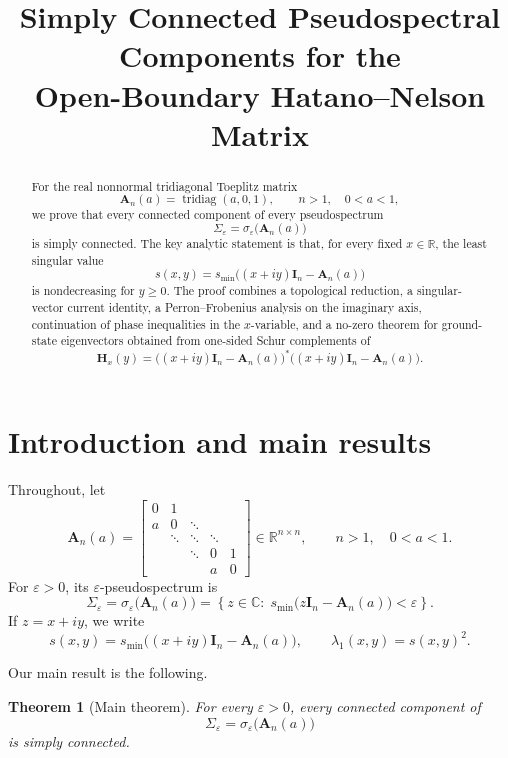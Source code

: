 \documentclass[11pt]{article}
\title{Simply Connected Pseudospectral Components for the\\ Open-Boundary Hatano--Nelson Matrix}
\author{}
\date{}
\numberwithin{equation}{section}
\newtheorem{theorem}{Theorem}[section]
\begin{document}
\maketitle

\begin{abstract}
For the real nonnormal tridiagonal Toeplitz matrix
\[
\mathbf A_n(a)=\operatorname{tridiag}(a,0,1),\qquad n>1,\quad 0<a<1,
\]
we prove that every connected component of every pseudospectrum
\[
\Sigma_\varepsilon=\sigma_\varepsilon\bigl(\mathbf A_n(a)\bigr)
\]
is simply connected.  The key analytic statement is that, for every fixed
$x\in\mathbb{R}$, the least singular value
\[
s(x,y)=s_{\min}\!\bigl((x+iy)\mathbf I_n-\mathbf A_n(a)\bigr)
\]
is nondecreasing for $y\ge 0$.  The proof combines a topological reduction,
a singular-vector current identity, a Perron--Frobenius analysis on the
imaginary axis, continuation of phase inequalities in the $x$-variable, and a
no-zero theorem for ground-state eigenvectors obtained from one-sided Schur
complements of
\[
\mathbf H_x(y)=\bigl((x+iy)\mathbf I_n-\mathbf A_n(a)\bigr)^*
\bigl((x+iy)\mathbf I_n-\mathbf A_n(a)\bigr).
\]
\end{abstract}

\section{Introduction and main results}

Throughout, let
\[
\mathbf A_n(a)=
\begin{bmatrix}
0 & 1 \\
a & 0 & \ddots \\
& \ddots & \ddots & \ddots \\
&& \ddots & 0 & 1 \\
&&& a & 0
\end{bmatrix}\in\mathbb{R}^{n\times n},
\qquad n>1,\quad 0<a<1.
\]
For $\varepsilon>0$, its $\varepsilon$-pseudospectrum is
\[
\Sigma_\varepsilon
=
\sigma_\varepsilon\bigl(\mathbf A_n(a)\bigr)
=
\left\{
z\in\mathbb{C}:\;
s_{\min}\!\bigl(z\mathbf I_n-\mathbf A_n(a)\bigr)<\varepsilon
\right\}.
\]
If $z=x+iy$, we write
\[
s(x,y)=s_{\min}\!\bigl((x+iy)\mathbf I_n-\mathbf A_n(a)\bigr),
\qquad
\lambda_1(x,y)=s(x,y)^2.
\]

Our main result is the following.

\begin{theorem}[Main theorem]\label{thm:main}
For every $\varepsilon>0$, every connected component of
\[
\Sigma_\varepsilon=\sigma_\varepsilon\bigl(\mathbf A_n(a)\bigr)
\]
is simply connected.
\end{theorem}
\end{document}

